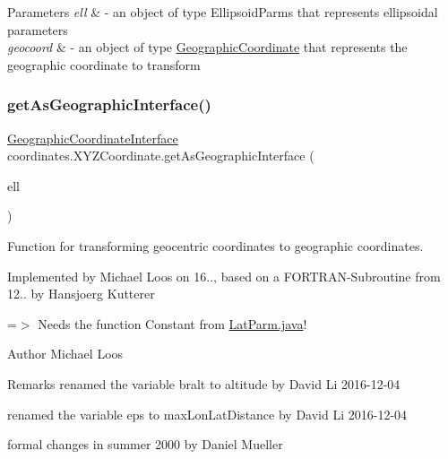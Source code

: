 \begin{DoxyParams}{Parameters}
{\em ell} & -\/ an object of type Ellipsoid\+Parms that represents ellipsoidal parameters \\
\hline
{\em geocoord} & -\/ an object of type \hyperlink{classcoordinates_1_1_geographic_coordinate}{Geographic\+Coordinate} that represents the geographic coordinate to transform \\
\hline
\end{DoxyParams}
\mbox{\label{classcoordinates_1_1_x_y_z_coordinate_add6f4e104b8f7c0dfc2f7d63594abe0d}} 
\subsubsection{\texorpdfstring{get\+As\+Geographic\+Interface()}{getAsGeographicInterface()}}
{\footnotesize\ttfamily \hyperlink{classcoordinates_1_1_geographic_coordinate_interface}{Geographic\+Coordinate\+Interface} coordinates.\+X\+Y\+Z\+Coordinate.\+get\+As\+Geographic\+Interface (\begin{DoxyParamCaption}\item[{\hyperlink{classparams_1_1_ellipsoid_parms}{Ellipsoid\+Parms}}]{ell }\end{DoxyParamCaption})}



Function for transforming geocentric coordinates to geographic coordinates. 

Implemented by Michael Loos on 16.., based on a F\+O\+R\+T\+R\+A\+N-\/\+Subroutine from 12.. by Hansjoerg Kutterer 

=$>$ Needs the function \textquotesingle{}Constant\textquotesingle{} from \hyperlink{_lat_parm_8java}{Lat\+Parm.\+java}! 

\begin{DoxyAuthor}{Author}
Michael Loos 
\end{DoxyAuthor}
\begin{DoxyRemark}{Remarks}
renamed the variable bralt to altitude by David Li 2016-\/12-\/04 

renamed the variable eps to max\+Lon\+Lat\+Distance by David Li 2016-\/12-\/04 

formal changes in summer 2000 by Daniel Mueller 
\end{DoxyRemark}

